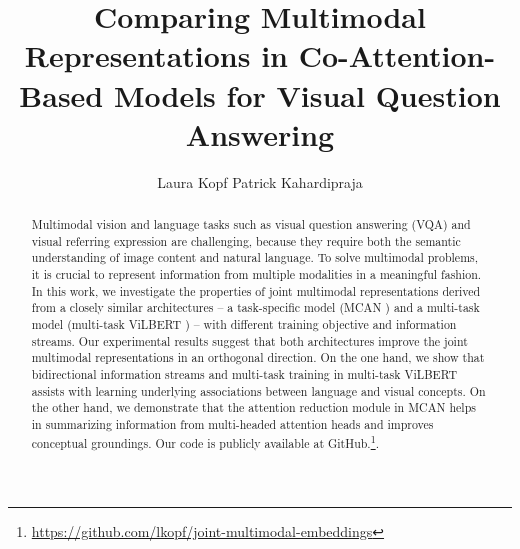 \documentclass{article}
\title{Comparing Multimodal Representations in Co-Attention-Based Models for Visual Question Answering}
\author{%
   Laura Kopf%
  \And
   Patrick Kahardipraja \\
}
\begin{document}
\maketitle


\begin{abstract}
Multimodal vision and language tasks such as visual question answering (VQA) and visual referring expression are challenging, because they require both the semantic understanding of image content and natural language. To solve multimodal problems, it is crucial to represent information from multiple modalities in a meaningful fashion. %
In this work, we investigate the properties of joint multimodal representations derived from a closely similar architectures -- %
a task-specific model (MCAN \citep{yu2019mcan}) and a multi-task model (multi-task ViLBERT \citep{lu2020multitask}) -- with different training objective and information streams. %
Our experimental results suggest that both architectures improve the joint multimodal representations in an orthogonal direction. On the one hand, we show that bidirectional information streams and multi-task training in multi-task ViLBERT assists with learning underlying associations between language and visual concepts. On the other hand, we demonstrate that the attention reduction module in MCAN helps in summarizing information from multi-headed attention heads and improves conceptual groundings.
Our code is publicly available at GitHub.\footnote{\url{https://github.com/lkopf/joint-multimodal-embeddings}}. %
\end{abstract}
\end{document}
